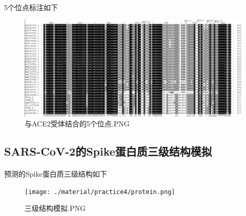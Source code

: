 \documentclass[supercite]{HustGraduPaper}
\begin{document}
	  \paragraph{}\label{subpara:subpara}5个位点标注如下
		\begin{figure}[H]
			\centering
			\includegraphics[width=1\textwidth]{./material/practice4/ACE2_mark.jpg}
			\caption{与ACE2受体结合的5个位点.PNG}
		\end{figure}
	\subsection{SARS-CoV-2的Spike蛋白质三级结构模拟}
	  \paragraph{}\label{subpara:subpara}预测的Spike蛋白质三级结构如下
		\begin{figure}[H]
			\centering
			\texttt{[image: ./material/practice4/protein.png]}
			\caption{三级结构模拟.PNG}
		\end{figure}
\end{document}
